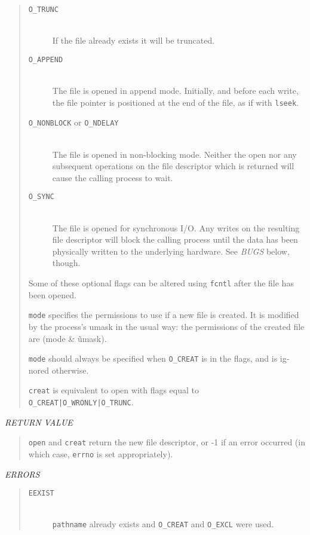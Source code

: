 \begin{appendix}
\begin{english}
\begin{quote}
\begin{description}
		\item[{\tt O\_TRUNC}]\mbox{}\\
		If the file already exists it will be truncated. \\

		\item[{\tt O\_APPEND}]\mbox{}\\
		The file is opened in append mode. Initially, and
		before each write, the file pointer is positioned
		at the end of the file, as if with {\tt lseek}. \\

		\item[{\tt O\_NONBLOCK} or {\tt O\_NDELAY}]\mbox{}\\
		The file is opened in non-blocking mode. Neither
		the open nor any subsequent operations on the file
		descriptor which is returned will cause the calling
		process to wait. \\

		\item[{\tt O\_SYNC}]\mbox{}\\
		The file is opened for synchronous I/O. Any writes
		on the resulting file descriptor will block the
		calling process until the data has been physically
		written to the underlying hardware. See {\sl BUGS}
		below, though.
	\end{description}

	Some of these optional flags can be altered using {\tt fcntl}
	after the file has been opened.

	{\tt mode} specifies the permissions to use if a new file is
	created. It is modified by the process's umask in the usual
	way: the permissions of the created file are (mode \& \~umask).

	{\tt mode} should always be specified when {\tt O\_CREAT} is in 
	the flags, and is ignored otherwise.

	{\tt creat} is equivalent to open with flags equal to {\tt
	O\_CREAT}\verb=|={\tt O\_WRONLY}\verb=|={\tt O\_TRUNC}.
\end{quote}

{\sl RETURN VALUE}
\begin{quote}
	{\tt open} and {\tt creat} return the new file descriptor, or -1 if
	an error occurred (in which case, {\tt errno} is set appropriately).
\end{quote}

{\sl ERRORS}
\begin{quote}
\begin{description}
	\item[{\tt EEXIST}]\mbox{}\\
		{\tt pathname} already exists and {\tt O\_CREAT} and {\tt O\_EXCL}
were
		used.


\end{description}
\end{quote}
\end{english}
\end{appendix}
